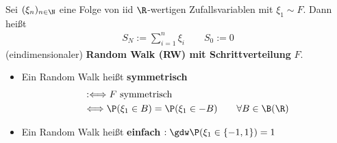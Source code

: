 \begin{defi}\enter %
Sei $(\xi_n)_{n\in\N}$ eine Folge von iid $\R$-wertigen Zufallsvariablen mit $\xi_1\sim F$. Dann heißt
\begin{align*}
S_N:=\sum\limits_{i=1}^n\xi_i\qquad S_0:=0
\end{align*}
(eindimensionaler) \textbf{Random Walk (RW) mit Schrittverteilung} $F$.
\begin{itemize}
\item Ein Random Walk heißt \textbf{symmetrisch}
\begin{align*}
&:\Longleftrightarrow F\text{ symmetrisch}\\
&\Longleftrightarrow\P(\xi_1\in B)=\P(\xi_1\in -B)\qquad\forall B\in\B(\R)
\end{align*}
\item Ein Random Walk heißt \textbf{einfach} $:\gdw\P(\xi_1\in\lbrace-1,1\rbrace)=1$
\end{itemize}
\end{defi}

